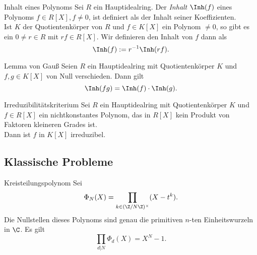 \begin{karte}{Inhalt eines Polynoms}
    Sei \(R\) ein Hauptidealring. Der \textit{Inhalt} \(\Inh(f)\) 
    eines Polynoms \(f\in R[X], f \neq 0\), ist definiert als der 
    Inhalt seiner Koeffizienten. \\
    Ist \(K\) der Quotientenkörper von \(R\) und \(f \in K[X]\) 
    ein Polynom \(\neq 0\), so gibt es ein \(0 \neq r \in R\) 
    mit \(rf \in R[X]\). Wir definieren den Inhalt von \(f\) dann als 
    \[ \Inh(f) := r^{-1} \Inh(rf). \]
\end{karte}

\begin{karte}{Lemma von Gauß}
    Seien \(R\) ein Hauptidealring mit Quotientenkörper \(K\) und 
    \(f,g\in K[X]\) von Null verschieden. Dann gilt 
    \[ \Inh(fg) = \Inh(f) \cdot \Inh(g). \]
\end{karte}

\begin{karte}{Irreduzibilitätskriterium}
    Sei \(R\) ein Hauptidealring mit Quotientenkörper \(K\) 
    und \(f\in R[X]\) ein nichtkonstantes Polynom, das in \(R[X]\) 
    kein Produkt von Faktoren kleineren Grades ist. \\
    Dann ist \(f\) in \(K[X]\) irreduzibel.
\end{karte}

\subsection{Klassische Probleme}

\begin{karte}{Kreisteilungspolynom}
    Sei 
    \[ \Phi_N(X) = \prod_{k\in (\Z/N\Z)^\times} (X - t^k). \]
    Die Nullstellen dieses Polynoms sind genau die 
    primitiven \(n\)-ten Einheitswurzeln in \(\C\). Es gilt 
    \[ \prod_{d|N} \Phi_d(X) = X^N - 1. \]
\end{karte}
